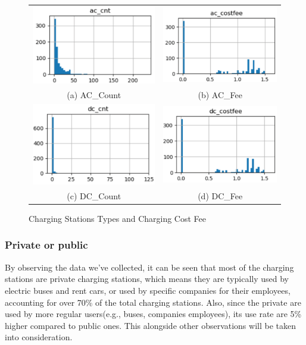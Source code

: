 \documentclass[runningheads]{llncs}
\begin{document}
\begin{figure}[!htbp]
	\begin{tabular}{cc}
		\includegraphics[width=0.45\columnwidth]{./figures/ac_cnt.pdf} &  \includegraphics[width=0.45\columnwidth]{./figures/ac_fee.pdf} \\
		(a) AC\_Count & (b) AC\_Fee \\[6pt] 
		\includegraphics[width=0.45\columnwidth]{./figures/dc_cnt.pdf} &
		\includegraphics[width=0.45\columnwidth]{./figures/dc_fee.pdf} \\
		(c) DC\_Count & (d) DC\_Fee
	\end{tabular}
	\centering
	\caption{Charging Stations Types and Charging Cost Fee}
	\label{fig5}
\end{figure}

\subsubsection{Private or public}
By observing the data we've collected, it can be seen that most of the charging stations are private charging stations, which means they are typically used by electric buses and rent cars, or used by specific companies for their employees, accounting for over 70\% of the total charging stations. Also, since the private are used by more regular users(e.g., buses, companies employees), its use rate are 5\% higher compared to public ones. This alongside other observations will be taken into consideration.
\end{document}
